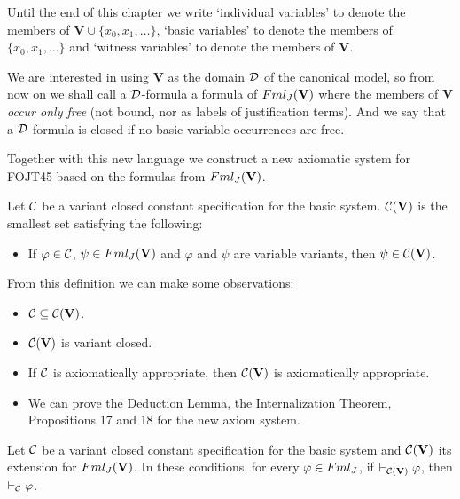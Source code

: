 \qquad Until the end of this chapter we write `individual variables' to denote the members of $\textbf{V}\cup \{x_{0}, x_{1}, \dots \}$, `basic variables' to denote the members of $\{x_{0}, x_{1}, \dots \}$ and `witness variables' to denote the members of \textbf{V}.


\qquad We are interested in using $\textbf{V}$ as the domain $\mathcal{D}$ of the canonical model, so from now on we shall call a $\mathcal{D}$-formula a formula of $Fml_{J}(\textbf{V})$ where the members of $\textbf{V}$ \textit{occur only free} (not bound, nor as labels of justification terms). And we say that a $\mathcal{D}$-formula is closed if no basic variable occurrences are free.



\qquad Together with this new language we construct a new axiomatic system for FOJT45 based on the formulas from $Fml_{J}(\textbf{V})$.


\begin{defn}
	Let $\mathcal{C}$ be a variant closed constant specification for the basic system. $\mathcal{C}(\textbf{V})$ is the smallest set satisfying the following:
	
	\begin{itemize}
		\item[] If $\varphi \in \mathcal{C}$, $\psi \in Fml_{J}(\textbf{V})$ and $\varphi$ and $\psi$ are variable variants, then $\psi \in \mathcal{C}(\textbf{V})$.
	\end{itemize}    
\end{defn}



\qquad From this definition we can make some observations:
\begin{itemize}
	\item $\mathcal{C} \subseteq \mathcal{C}(\textbf{V})$.
	\item $\mathcal{C}(\textbf{V})$ is variant closed.
	\item If $\mathcal{C}$ is axiomatically appropriate, then $\mathcal{C}(\textbf{V})$ is axiomatically appropriate. 
	\item We can prove the Deduction Lemma, the Internalization Theorem, Propositions 17 and 18 for the new axiom system.
\end{itemize}

\begin{pro}
	Let $\mathcal{C}$ be a variant closed constant specification for the basic system and $\mathcal{C}(\textbf{V})$ its extension for $Fml_{J}(\textbf{V})$. In these conditions, for every $\varphi \in Fml_{J}$, if $\vdash_{\mathcal{C}(\textbf{V})} \varphi$, then $\vdash_{\mathcal{C}} \varphi$. 
\end{pro}

